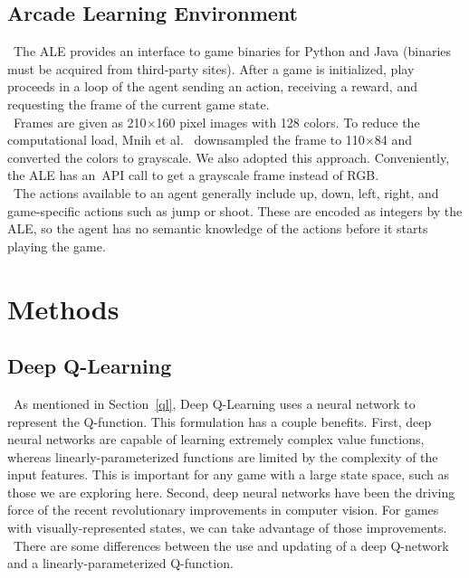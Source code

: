 \documentclass[conference]{IEEEtran}
\begin{document}
\subsection{Arcade Learning Environment}
\noindent\ The ALE provides an interface to game binaries for Python and Java (binaries must
be acquired from third-party sites). After a game is initialized, play proceeds in a loop
of the agent sending an action, receiving a reward, and requesting the frame of the current
game state.\\
\indent\ Frames are given as 210$\times$160 pixel images with 128 colors. To reduce the
computational load, Mnih et al.~\cite{mnih2013playing} downsampled the frame to 110$\times$84
and converted the colors to grayscale. We also adopted this approach. Conveniently, the ALE
has an\ API call to get a grayscale frame instead of RGB.\\
\indent\ The actions available to an agent generally include up, down, left, right, and
game-specific actions such as jump or shoot. These are encoded as integers by the ALE, so the
agent has no semantic knowledge of the actions before it starts playing the game.

\section{Methods}
\subsection{Deep Q-Learning}\label{deep_q}
\noindent\ As mentioned in Section~\ref{ql}, Deep Q-Learning uses a neural network to
represent the Q-function. This formulation has a couple benefits. First, deep neural networks
are capable of learning extremely complex value functions, whereas linearly-parameterized
functions are limited by the complexity of the input features. This is important for any
game with a large state space, such as those we are exploring here. Second, deep neural
networks have been the driving force of the recent revolutionary improvements in computer
vision. For games with visually-represented states, we can take advantage of those
improvements.\\
\indent\ There are some differences between the use and updating of a deep Q-network and
a linearly-parameterized Q-function.
\end{document}
